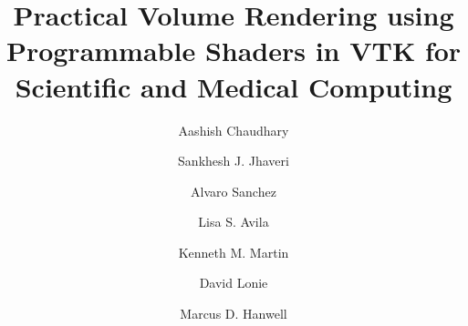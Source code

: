 \title{Practical Volume Rendering using Programmable Shaders in VTK for Scientific and Medical Computing}

\author{Aashish Chaudhary}

\author{Sankhesh J. Jhaveri}

\author{Alvaro Sanchez\corref{}}

\author{Lisa S. Avila}

\author{Kenneth M. Martin}

\author{David Lonie}

\author{Marcus D. Hanwell}

\address{Kitware, Inc., 28 Corporate Drive, Clifton Park, NY 12065, USA}
